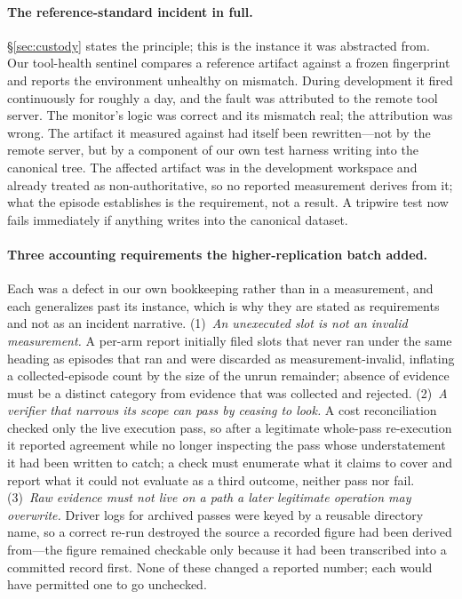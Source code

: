 \documentclass{article}
\begin{document}
\paragraph{The reference-standard incident in full.} \S\ref{sec:custody} states the principle; this is the instance it was abstracted from. Our tool-health sentinel compares a reference artifact against a frozen fingerprint and reports the environment unhealthy on mismatch. During development it fired continuously for roughly a day, and the fault was attributed to the remote tool server. The monitor's logic was correct and its mismatch real; the attribution was wrong. The artifact it measured against had itself been rewritten---not by the remote server, but by a component of our own test harness writing into the canonical tree. The affected artifact was in the development workspace and already treated as non-authoritative, so no reported measurement derives from it; what the episode establishes is the requirement, not a result. A tripwire test now fails immediately if anything writes into the canonical dataset.

\paragraph{Three accounting requirements the higher-replication batch added.} Each was a defect in our own bookkeeping rather than in a measurement, and each generalizes past its instance, which is why they are stated as requirements and not as an incident narrative. (1)~\emph{An unexecuted slot is not an invalid measurement.} A per-arm report initially filed slots that never ran under the same heading as episodes that ran and were discarded as measurement-invalid, inflating a collected-episode count by the size of the unrun remainder; absence of evidence must be a distinct category from evidence that was collected and rejected. (2)~\emph{A verifier that narrows its scope can pass by ceasing to look.} A cost reconciliation checked only the live execution pass, so after a legitimate whole-pass re-execution it reported agreement while no longer inspecting the pass whose understatement it had been written to catch; a check must enumerate what it claims to cover and report what it could not evaluate as a third outcome, neither pass nor fail. (3)~\emph{Raw evidence must not live on a path a later legitimate operation may overwrite.} Driver logs for archived passes were keyed by a reusable directory name, so a correct re-run destroyed the source a recorded figure had been derived from---the figure remained checkable only because it had been transcribed into a committed record first. None of these changed a reported number; each would have permitted one to go unchecked.
\end{document}
